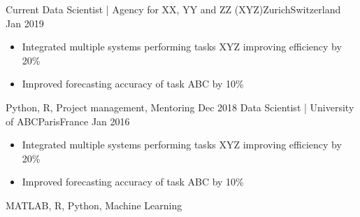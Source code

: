 %
%
%
\begin{experiences}
  \experience
    {Current}   {Data Scientist | Agency for XX, YY and ZZ (XYZ)}{Zurich}{Switzerland}
    {Jan 2019} {
                    \begin{itemize}
                    \item  Integrated multiple systems performing tasks XYZ improving efficiency by 20\%
                    \item  Improved forecasting accuracy of task ABC by 10\%
                    \end{itemize}
                }
                    {Python, R, Project management, Mentoring}
  \emptySeparator
  \experience
    {Dec 2018} {Data Scientist | University of ABC}{Paris}{France} 
    {Jan 2016} {  \begin{itemize}
                    \item  Integrated multiple systems performing tasks XYZ improving efficiency by 20\%
                    \item  Improved forecasting accuracy of task ABC by 10\%
                    \end{itemize}
                }
                    {MATLAB, R, Python, Machine Learning}
\end{experiences}
